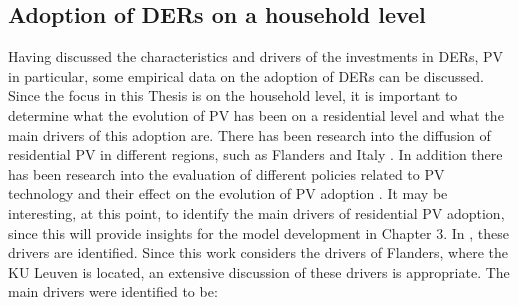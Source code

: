 \subsection{Adoption of DERs on a household level}
Having discussed the characteristics and drivers of the investments in DERs, PV in particular, some empirical data on the adoption of DERs can be discussed. Since the focus in this Thesis is on the household level, it is important to determine    what the evolution of PV has been on a residential level and what the main drivers of this adoption are. There has been research into the diffusion of residential PV in different regions, such as Flanders \cite{FlandersAdoption} and Italy \cite{ItalyAdoption}. In addition there has been research into the evaluation of different policies related to PV technology and their effect on the evolution of PV adoption \cite{ABMPV}. 
\newline \newline \noindent
It may be interesting, at this point, to identify the main drivers of residential PV adoption, since this will provide insights for the model development in Chapter 3. In \cite{FlandersAdoption}, these drivers are identified. Since this work considers the drivers of Flanders, where the KU Leuven is located, an extensive discussion of these drivers is appropriate. The main drivers were identified to be: 

